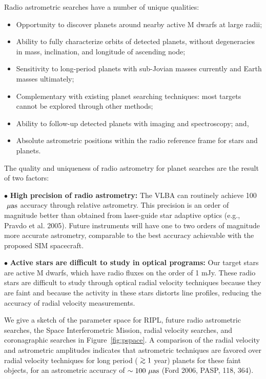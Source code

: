 \documentclass[12pt,preprint]{aastex}
\begin{document}
Radio astrometric searches have a number of unique qualities:
\begin{itemize}

\item Opportunity to discover planets around nearby active M dwarfs at
large radii;
\item Ability to fully characterize orbits of detected planets,
without degeneracies in mass, inclination, and longitude of ascending
node;
\item Sensitivity to long-period planets with sub-Jovian masses
currently and Earth masses ultimately;
\item Complementary with existing planet searching techniques: most
targets cannot be explored through other methods;
\item Ability to follow-up detected planets with imaging and
spectroscopy; and,
\item Absolute astrometric positions within the radio reference frame
for stars and planets.
\end{itemize}


The quality and uniqueness of radio astrometry for planet searches are
the result of two factors:

	$\bullet$ {\bf High precision of radio astrometry:} The VLBA
	can routinely achieve 100 ${\rm\ \mu as}$ accuracy through
	relative astrometry.  This precision is
	an order of magnitude better than obtained from laser-guide
	star adaptive optics (e.g., Pravdo et al. 2005).
	Future instruments will have one to two orders of magnitude
	more accurate astrometry, comparable to the best accuracy
        achievable with the proposed SIM spacecraft. 


	$\bullet$ {\bf Active stars are difficult to study in optical
	programs:} Our target stars are active M dwarfs,
	which have radio fluxes on the order of 1 mJy.  These radio stars
	are difficult to study through optical radial velocity
	techniques because they are faint and because the activity in
	these stars distorts line profiles, reducing the accuracy of
	radial velocity measurements.

We give a sketch of the parameter space for RIPL, future radio
astrometric searches, the Space Interferometric Mission, radial
velocity searches, and coronagraphic searches in
Figure~\ref{fig:pspace}.  A comparison of the radial velocity and
astrometric amplitudes indicates that astrometric techniques are
favored over radial velocity techniques for long period ($\gsim 1$
year) planets for these faint objects, for an astrometric accuracy of
$\sim 100 {\rm\ \mu as}$ (Ford 2006, PASP, 118, 364).
\end{document}
